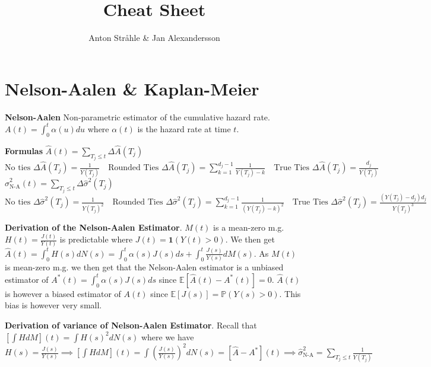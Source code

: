 \documentclass{article}
\title{Cheat Sheet}
\author{Anton Stråhle \& Jan Alexandersson}
\begin{document}
\section*{Nelson-Aalen \& Kaplan-Meier}
\textbf{Nelson-Aalen} Non-parametric estimator of the cumulative hazard rate. $A(t) = \int_0^t \alpha(u) du$ where $\alpha(t)$ is the hazard rate at time $t$. 

\medskip

\textbf{Formulas} $ \hat{A}(t) = \sum_{T_j \leq t} \Delta \hat{A}(T_j)$ \newline
$
\text{No ties } \Delta \hat{A}(T_j) = \frac{1}{Y(T_j)} \quad
\text{Rounded Ties } \Delta \hat{A}(T_j) = \sum_{k=1}^{d_j -1}\frac{1}{Y(T_j) - k} \quad
\text{True Ties } \Delta \hat{A}(T_j) = \frac{d_j}{Y(T_j)} $ \newline $
\hat\sigma^2_{\text{N-A}}(t) = \sum_{T_j \leq t} \Delta \hat\sigma^2(T_j) $\newline 
$
\text{No ties } \Delta \hat\sigma^2(T_j) = \frac{1}{Y(T_j)^2} \quad
\text{Rounded Ties } \Delta \hat\sigma^2(T_j) = \sum_{k=1}^{d_j -1}\frac{1}{(Y(T_j) - k)^2} \quad
\text{True Ties } \Delta \hat\sigma^2(T_j) = \frac{(Y(T_j)-d_j)d_j}{Y(T_j)^3}$

\medskip


\textbf{Derivation of the Nelson-Aalen Estimator}. $M(t)$ is a mean-zero m.g. $H(t) = \frac{J(t)}{Y(t)}$ is predictable where $J(t) = \mathbf{1}(Y(t) > 0)$. We then get $\hat{A}(t) = \int_0^t H(s)dN(s) = \int_0^t\alpha(s)J(s)ds + \int_0^t \frac{J(s)}{Y(s)}dM(s)$. As $M(t)$ is mean-zero m.g. we then get that the Nelson-Aalen estimator is a unbiased estimator of $A^*(t) = \int_0^t \alpha(s)J(s)ds $ since $\mathbb{E}\left[\hat{A}(t) - A^*(t)\right] = 0$. $\hat{A}(t)$ is however a biased estimator of $A(t)$ since $\mathbb{E}[J(s)] = \mathbb{P}(Y(s) > 0)$. This bias is however very small.

\medskip


\textbf{Derivation of variance of Nelson-Aalen Estimator}. Recall that $\left[\int HdM\right](t) = \int H(s)^2dN(s)$ where we have $H(s) = \frac{J(s)}{Y(s)} \implies \left[\int HdM\right](t) = \int \left(\frac{J(s)}{Y(s)}\right)^2dN(s) = [\hat{A} - A^*](t) \implies \hat\sigma^2_{\text{N-A}} = \sum_{T_j \leq t} \frac{1}{Y(T_j)}$ 

\medskip
\end{document}
